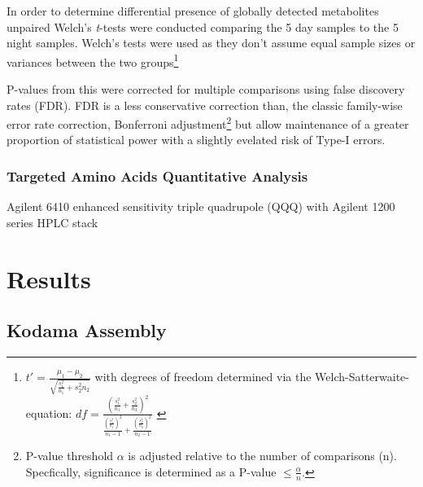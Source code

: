 %
%


In order to determine differential presence of globally detected metabolites
unpaired Welch's \textit{t}-tests were conducted comparing the 5 day samples to the 5
night samples. Welch's tests were used as they don't assume equal sample sizes or variances
between the two groups\citep{Welch1947}\footnote{
    \(t' = \frac{\mu_1 - \mu_2}{\sqrt{\frac{s^2_1}{n_1} + {s^2_2}{n_2}}}\)
    with degrees of freedom determined via the Welch-Satterwaite-equation:
    \(df = \frac{(\frac{s^2_1}{n_1} + \frac{s^2_2}{n_2})^2}{\frac{(\frac{s^2_1}{n_1})^2}{n_1 - 1} + \frac{(\frac{s^2_2}{n_2})^2}{n_2 - 1}}\)
    \citep{Ruxton2006}
}

P-values from this were corrected 
for multiple comparisons using false discovery rates (FDR).  FDR is a
less conservative correction than, the classic family-wise error rate correction,
Bonferroni adjustment\footnote{
    P-value threshold \(\alpha\) is adjusted relative to the number of comparisons (n). 
Specfically, significance is determined as a P-value \(\leq \frac{\alpha}{n}\).} but
allow maintenance of a greater proportion of statistical power with a 
slightly evelated risk of Type-I errors. 
%
%

%
%
\subsubsection{Targeted Amino Acids Quantitative Analysis}

Agilent 6410 enhanced sensitivity triple quadrupole (QQQ) 
with Agilent 1200 series HPLC stack





\section{Results}

\subsection{Kodama Assembly}

